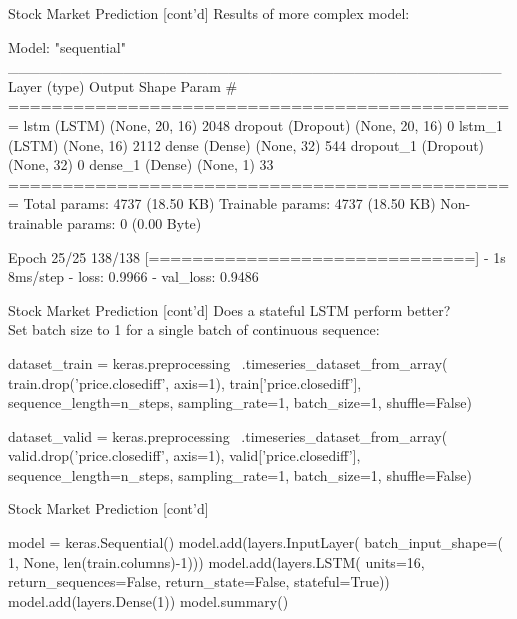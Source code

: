 \documentclass[ignorenonframetext,xcolor=x11names]{beamer}
\begin{document}
\begin{frame}[label=withcode,fragile]{Stock Market Prediction \small [cont'd]}
Results of more complex model:
\begin{textcode}
Model: "sequential"
_______________________________________________
 Layer (type)         Output Shape      Param #   
===============================================
 lstm (LSTM)          (None, 20, 16)    2048      
 dropout (Dropout)    (None, 20, 16)    0         
 lstm_1 (LSTM)        (None, 16)        2112      
 dense (Dense)        (None, 32)        544       
 dropout_1 (Dropout)  (None, 32)        0         
 dense_1 (Dense)      (None, 1)         33        
===============================================
Total params: 4737 (18.50 KB)
Trainable params: 4737 (18.50 KB)
Non-trainable params: 0 (0.00 Byte)

Epoch 25/25
138/138 [==============================] - 1s 8ms/step 
- loss: 0.9966 - val_loss: 0.9486
\end{textcode}
\end{frame}

\begin{frame}[label=withcode,fragile]{Stock Market Prediction \small [cont'd]}
Does a stateful LSTM perform better? \\

Set batch size to 1 for a single batch of continuous sequence:
\begin{pythoncode}
dataset_train = keras.preprocessing \
    .timeseries_dataset_from_array(
        train.drop('price.closediff', axis=1),
        train['price.closediff'],
        sequence_length=n_steps,
        sampling_rate=1, batch_size=1, shuffle=False)
\end{pythoncode}

\begin{pythoncode}
dataset_valid = keras.preprocessing \
    .timeseries_dataset_from_array(
        valid.drop('price.closediff', axis=1),
        valid['price.closediff'],
        sequence_length=n_steps,
        sampling_rate=1, batch_size=1, shuffle=False)
\end{pythoncode}
\end{frame}

\begin{frame}[label=withcode,fragile]{Stock Market Prediction \small [cont'd]}
\begin{pythoncode}
model = keras.Sequential()
model.add(layers.InputLayer(
    batch_input_shape=(
        1, None, len(train.columns)-1)))
model.add(layers.LSTM(
    units=16,
    return_sequences=False,
    return_state=False,
    stateful=True))
model.add(layers.Dense(1))
model.summary()
\end{pythoncode}
\end{frame}
\end{document}
